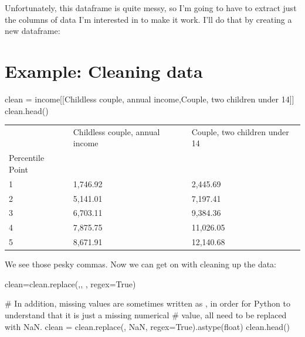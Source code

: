 \documentclass[
  letterpaper,
  DIV=11,
  numbers=noendperiod]{scrreprt}
\newenvironment{Shaded}{\begin{snugshade}}{\end{snugshade}}
\newcommand{\CommentTok}[1]{\textcolor[rgb]{0.37,0.37,0.37}{#1}}
\newcommand{\NormalTok}[1]{\textcolor[rgb]{0.00,0.23,0.31}{#1}}
\newcommand{\OperatorTok}[1]{\textcolor[rgb]{0.37,0.37,0.37}{#1}}
\newcommand{\StringTok}[1]{\textcolor[rgb]{0.13,0.47,0.30}{#1}}
\newcommand{\VariableTok}[1]{\textcolor[rgb]{0.07,0.07,0.07}{#1}}
\begin{document}
Unfortunately, this dataframe is quite messy, so I'm going to have to
extract just the columns of data I'm interested in to make it work. I'll
do that by creating a new dataframe:

\hypertarget{example-cleaning-data}{%
\section{Example: Cleaning data}\label{example-cleaning-data}}

\begin{Shaded}
\begin{Highlighting}[]
\NormalTok{clean }\OperatorTok{=}\NormalTok{ income[[}\StringTok{\textquotesingle{}Childless couple, annual income\textquotesingle{}}\NormalTok{,}\StringTok{\textquotesingle{}Couple, two children under 14\textquotesingle{}}\NormalTok{]]}
\NormalTok{clean.head()}
\end{Highlighting}
\end{Shaded}

\begin{longtable}[]{@{}lll@{}}
\toprule()
& Childless couple, annual income & Couple, two children under 14 \\
Percentile Point & & \\
\midrule()
\endhead
1 & 1,746.92 & 2,445.69 \\
2 & 5,141.01 & 7,197.41 \\
3 & 6,703.11 & 9,384.36 \\
4 & 7,875.75 & 11,026.05 \\
5 & 8,671.91 & 12,140.68 \\
\bottomrule()
\end{longtable}

We see those pesky commas. Now we can get on with cleaning up the data:

\begin{Shaded}
\begin{Highlighting}[]
\NormalTok{clean}\OperatorTok{=}\NormalTok{clean.replace(}\StringTok{\textquotesingle{},\textquotesingle{}}\NormalTok{, }\StringTok{\textquotesingle{}\textquotesingle{}}\NormalTok{, regex}\OperatorTok{=}\VariableTok{True}\NormalTok{)}

\CommentTok{\# In addition, missing values are sometimes written as \textquotesingle{}{-}\textquotesingle{}, in order for Python to understand that it is just a missing numerical }
\CommentTok{\# value, all \textquotesingle{}{-}\textquotesingle{} need to be replaced with \textquotesingle{}NaN\textquotesingle{}.}
\NormalTok{clean }\OperatorTok{=}\NormalTok{ clean.replace(}\StringTok{\textquotesingle{}{-}\textquotesingle{}}\NormalTok{, }\StringTok{\textquotesingle{}NaN\textquotesingle{}}\NormalTok{, regex}\OperatorTok{=}\VariableTok{True}\NormalTok{).astype(}\StringTok{\textquotesingle{}float\textquotesingle{}}\NormalTok{)}
\NormalTok{clean.head()}
\end{Highlighting}
\end{Shaded}
\end{document}
